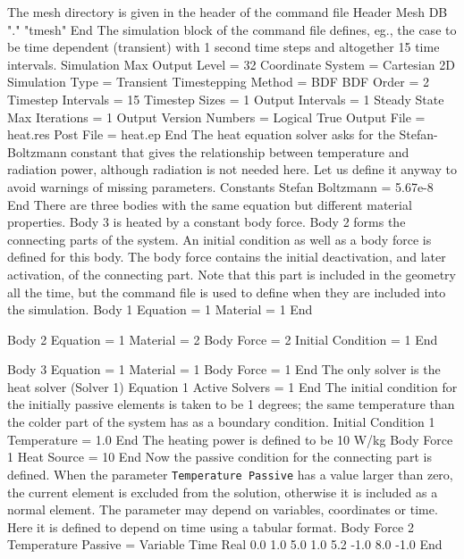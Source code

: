 The mesh directory is given in the header of the command file
%
\ttbegin
Header
  Mesh DB "." "tmesh"
End
\ttend
%
The simulation block of the command file defines, eg., the case to be time
dependent (transient) with 1 second time steps and altogether 15 time
intervals.  
%
\ttbegin
Simulation
  Max Output Level = 32
  Coordinate System = Cartesian 2D
  Simulation Type = Transient
  Timestepping Method = BDF
  BDF Order = 2
  Timestep Intervals = 15
  Timestep Sizes = 1
  Output Intervals = 1
  Steady State Max Iterations = 1
  Output Version Numbers = Logical True
  Output File = heat.res
  Post File = heat.ep
End
\ttend
%
The heat equation solver asks for the Stefan-Boltzmann constant that
gives the relationship between temperature and radiation power,
although radiation is not needed here. Let us define it anyway to
avoid warnings of missing parameters.
%
\ttbegin
Constants
  Stefan Boltzmann = 5.67e-8
End
\ttend
%
There are three bodies with the same equation but different material
properties. Body 3 is heated by a constant body force. Body 2 forms
the connecting parts of the system. An initial condition as well as a
body force is defined for this body. The body force contains the
initial deactivation, and later activation, of the connecting
part. Note that this part is included in the geometry all the time,
but the command file is used to define when they are included into the
simulation.
%
\ttbegin
Body 1
  Equation = 1
  Material = 1
End

Body 2
  Equation = 1
  Material = 2
  Body Force = 2
  Initial Condition = 1
End

Body 3
  Equation = 1
  Material = 1
  Body Force = 1
End
\ttend
%
The only solver is the heat solver (Solver 1)
%
\ttbegin
Equation 1
  Active Solvers = 1
End
\ttend
%
The initial condition for the initially passive elements is taken to
be 1 degrees; the same temperature than the colder part of the system
has as a boundary condition.
%
\ttbegin
Initial Condition 1
  Temperature = 1.0
End
\ttend
%
The heating power is defined to be 10 W/kg
%
\ttbegin
Body Force 1
  Heat Source = 10
End
\ttend
%
Now the passive condition for the connecting part is defined. When the
parameter \texttt{Temperature Passive} has a value larger than zero,
the current element is excluded from the solution, otherwise it is
included as a normal element. The parameter may depend on variables,
coordinates or time. Here it is defined to depend on time using a
tabular format.
%
\ttbegin
Body Force 2
  Temperature Passive = Variable Time
    Real
      0.0    1.0
      5.0    1.0
      5.2   -1.0
      8.0   -1.0
    End

